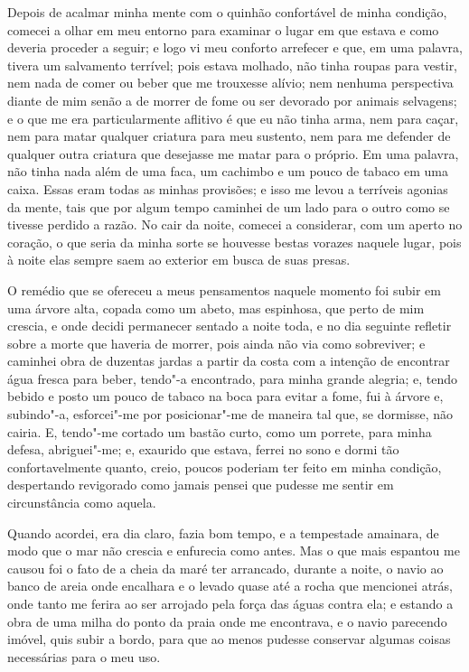 Depois de acalmar minha mente com o quinhão confortável de minha
condição, comecei a olhar em meu entorno para examinar o lugar em que
estava e como deveria proceder a seguir; e logo vi meu conforto
arrefecer e que, em uma palavra, tivera um salvamento terrível; pois
estava molhado, não tinha roupas para vestir, nem nada de comer ou beber
que me trouxesse alívio; nem nenhuma perspectiva diante de mim senão a
de morrer de fome ou ser devorado por animais selvagens; e o que me era
particularmente aflitivo é que eu não tinha arma, nem para caçar, nem
para matar qualquer criatura para meu sustento, nem para me defender de
qualquer outra criatura que desejasse me matar para o próprio. Em uma
palavra, não tinha nada além de uma faca, um cachimbo e um pouco de
tabaco em uma caixa. Essas eram todas as minhas provisões; e isso me
levou a terríveis agonias da mente, tais que por algum tempo caminhei de
um lado para o outro como se tivesse perdido a razão. No cair da noite,
comecei a considerar, com um aperto no coração, o que seria da minha
sorte se houvesse bestas vorazes naquele lugar, pois à noite elas sempre
saem ao exterior em busca de suas presas.

O remédio que se ofereceu a meus pensamentos naquele momento foi subir
em uma árvore alta, copada como um abeto, mas espinhosa, que perto de
mim crescia, e onde decidi permanecer sentado a noite toda, e no dia
seguinte refletir sobre a morte que haveria de morrer, pois ainda não
via como sobreviver; e caminhei obra de duzentas jardas a partir da
costa com a intenção de encontrar água fresca para beber, tendo"-a
encontrado, para minha grande alegria; e, tendo bebido e posto um pouco
de tabaco na boca para evitar a fome, fui à árvore e, subindo"-a,
esforcei"-me por posicionar"-me de maneira tal que, se dormisse, não
cairia. E, tendo"-me cortado um bastão curto, como um porrete, para minha
defesa, abriguei"-me; e, exaurido que estava, ferrei no sono e dormi tão
confortavelmente quanto, creio, poucos poderiam ter feito em minha
condição, despertando revigorado como jamais pensei que pudesse me
sentir em circunstância como aquela.

Quando acordei, era dia claro, fazia bom tempo, e a tempestade amainara,
de modo que o mar não crescia e enfurecia como antes. Mas o que mais
espantou me causou foi o fato de a cheia da maré ter arrancado, durante
a noite, o navio ao banco de areia onde encalhara e o levado quase até a
rocha que mencionei atrás, onde tanto me ferira ao ser arrojado pela
força das águas contra ela; e estando a obra de uma milha do ponto da
praia onde me encontrava, e o navio parecendo imóvel, quis subir a
bordo, para que ao menos pudesse conservar algumas coisas necessárias
para o meu uso.

